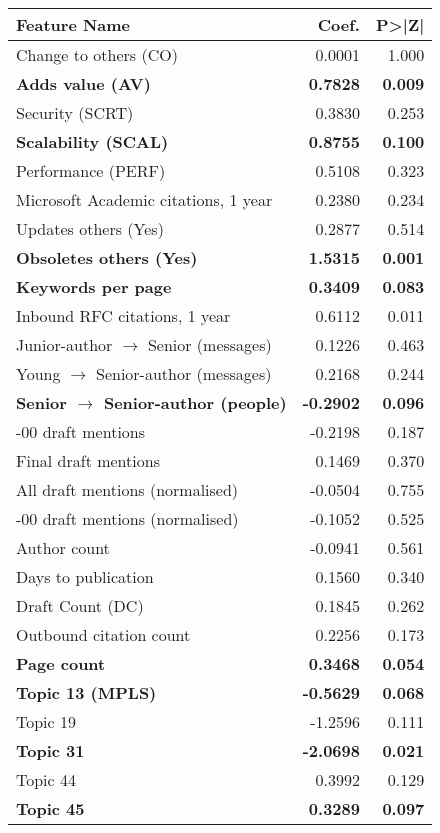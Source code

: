 \begin{table}
\begin{tabular}{lrr}
\toprule
Feature Name & Coef. & P>|Z| \\
\midrule
Change to others (CO) & 0.0001 & 1.000 \\
\textbf{Adds value (AV)} & \textbf{0.7828} & \textbf{0.009} \\
Security (SCRT) & 0.3830 & 0.253 \\
\textbf{Scalability (SCAL)} & \textbf{0.8755} & \textbf{0.100} \\
Performance (PERF) & 0.5108 & 0.323 \\
Microsoft Academic citations, 1 year & 0.2380 & 0.234 \\
Updates others (Yes) & 0.2877 & 0.514 \\
\textbf{Obsoletes others (Yes)} & \textbf{1.5315} & \textbf{0.001} \\
\textbf{Keywords per page} & \textbf{0.3409} & \textbf{0.083} \\
Inbound RFC citations, 1 year & 0.6112 & 0.011 \\
Junior-author $\rightarrow$ Senior (messages) & 0.1226 & 0.463 \\
Young $\rightarrow$ Senior-author (messages) & 0.2168 & 0.244 \\
\textbf{Senior $\rightarrow$ Senior-author (people)} & \textbf{-0.2902} & \textbf{0.096} \\
-00 draft mentions & -0.2198 & 0.187 \\
Final draft mentions & 0.1469 & 0.370 \\
All draft mentions (normalised) & -0.0504 & 0.755 \\
-00 draft mentions (normalised) & -0.1052 & 0.525 \\
Author count & -0.0941 & 0.561 \\
Days to publication & 0.1560 & 0.340 \\
Draft Count (DC) & 0.1845 & 0.262 \\
Outbound citation count & 0.2256 & 0.173 \\
\textbf{Page count} & \textbf{0.3468} & \textbf{0.054} \\
\textbf{Topic 13 (MPLS)} & \textbf{-0.5629} & \textbf{0.068} \\
Topic 19 & -1.2596 & 0.111 \\
\textbf{Topic 31} & \textbf{-2.0698} &\textbf{ 0.021} \\
Topic 44 & 0.3992 & 0.129 \\
\textbf{Topic 45} & \textbf{0.3289} & \textbf{0.097} \\

\end{tabular}
\end{table}
